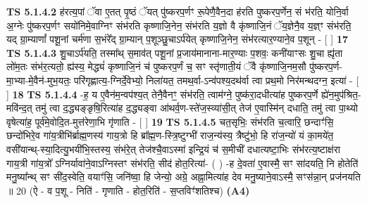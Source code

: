 \documentclass[17pt]{extarticle}
\begin{document}
                  \newline
                                \textbf{ TS 5.1.4.2} \newline
                  ह॑रत्य॒पां ॅवा ए॒तत् पृ॒ष्ठं ॅयत् पु॑ष्करप॒र्णꣳ रू॒पेणै॒वैन॒दा ह॑रति पुष्करप॒र्णेन॒ सं भ॑रति॒ योनि॒र्वा अ॒ग्नेः पु॑ष्करप॒र्णꣳ सयो॑निमे॒वाग्निꣳ संभ॑रति कृष्णाजि॒नेन॒ संभ॑रति य॒ज्ञो वै कृ॑ष्णाजि॒नं ॅय॒ज्ञेनै॒व य॒ज्ञ्ꣳ संभ॑रति॒ यद् ग्रा॒म्याणां᳚ पशू॒नां चर्म॑णा स॒भंरे᳚द् ग्रा॒म्यान् प॒शूञ्छु॒चाऽर्प॑येत् कृष्णाजि॒नेन॒ संभ॑रत्यार॒ण्याने॒व प॒शून् - [  ] \textbf{  17} \newline
                  \newline
                                \textbf{ TS 5.1.4.3} \newline
                  शु॒चाऽर्प॑यति॒ तस्मा᳚थ् स॒माव॑त् पशू॒नां प्र॒जाय॑मानाना-मार॒ण्याः प॒शवः॒ कनी॑याꣳसः शु॒चा ह्यृ॑ता लो॑म॒तः संभ॑र॒त्यतो॒ ह्य॑स्य॒ मेद्ध्यं॑ कृष्णाजि॒नं च॑ पुष्करप॒र्णं च॒ सꣳ स्तृ॑णाती॒यं ॅवै कृ॑ष्णाजि॒नम॒सौ पु॑ष्करप॒र्ण-मा॒भ्या-मे॒वैन॑-मुभ॒यतः॒ परि॑गृह्णात्य॒-ग्निर्दे॒वेभ्यो॒ निला॑यत॒ तमथ॒र्वा-ऽन्व॑पश्य॒दथ॑र्वा त्वा प्रथ॒मो निर॑मन्थदग्न॒ इत्या॑ - [  ] \textbf{  18} \newline
                  \newline
                                \textbf{ TS 5.1.4.4} \newline
                  -ह॒ य ए॒वैन॑म॒न्वप॑श्य॒त् तेनै॒वैनꣳ॒॒ संभ॑रति॒ त्वाम॑ग्ने॒ पुष्क॑रा॒दधीत्या॑ह पुष्करप॒र्णे ह्ये॑न॒मुप॑श्रित॒-मवि॑न्द॒त् तमु॑ त्वा द॒द्ध्यङ्ङृषि॒रित्या॑ह द॒द्ध्यङ्वा आ॑थर्व॒ण-स्ते॑ज॒स्व्या॑सी॒त् तेज॑ ए॒वास्मि॑न् दधाति॒ तमु॑ त्वा पा॒थ्यो वृषेत्या॑ह॒ पूर्व॑मे॒वोदि॒त-मुत्त॑रेणा॒भि गृ॑णाति - [  ] \textbf{  19} \newline
                  \newline
                                \textbf{ TS 5.1.4.5} \newline
                   \textbf{ } \newline
                  \newline
                      चत॒सृभिः॒ संभ॑रति च॒त्वारि॒ छन्दाꣳ॑सि॒ छन्दो॑भिरे॒व गा॑य॒त्रीभि॑र्ब्राह्म॒णस्य॑ गाय॒त्रो हि ब्रा᳚ह्म॒ण-स्त्रि॒ष्टुग्भी॑ राज॒न्य॑स्य॒ त्रैष्टु॑भो॒ हि रा॑ज॒न्यो॑ यं का॒मये॑त॒ वसी॑यान्थ्-स्या॒दित्यु॒भयी॑भि॒स्तस्य॒ संभ॑रे॒त् तेज॑श्चै॒वाऽस्मा॑ इन्द्रि॒यं च॑ स॒मीची॑ दधात्यष्टा॒भिः संभ॑रत्य॒ष्टाक्ष॑रा गाय॒त्री गा॑य॒त्रो᳚ ऽग्निर्यावा॑ने॒वाऽग्निस्तꣳ संभ॑रति॒ सीद॑ होत॒रित्या॑- ( ) -ह दे॒वता॑ ए॒वास्मै॒ सꣳ सा॑दयति॒ नि होतेति॑ मनु॒ष्या᳚न्थ् सꣳ सी॑द॒स्वेति॒ वयाꣳ॑सि॒ जनि॑ष्वा॒ हि जेन्यो॒ अग्रे॒ अह्ना॒मित्या॑ह देव मनु॒ष्याने॒वाऽस्मै॒ सꣳस॑न्ना॒न् प्रज॑नयति ॥ 20 (ऐ - व प॒शू - निति॑ - गृणाति - होत॒रिति॑ - स॒प्तविꣳ॑शतिश्च)  \textbf{(A4)} \newline \newline
\end{document}
